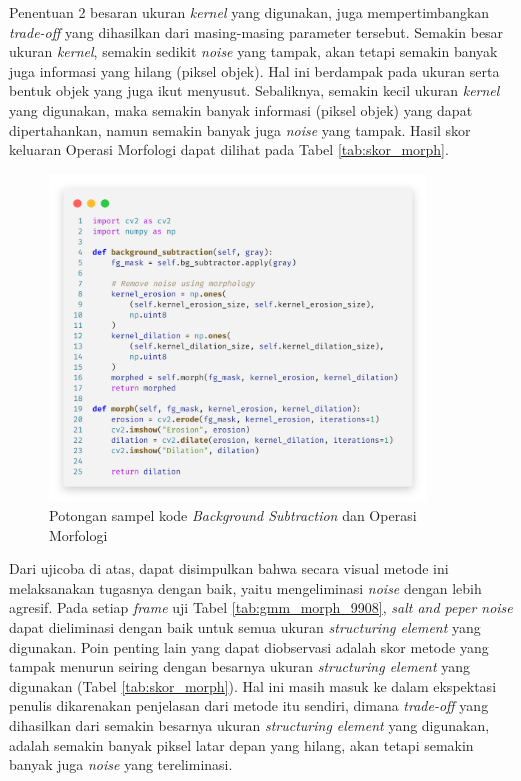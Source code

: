         Penentuan 2 besaran ukuran \textit{kernel} yang digunakan, juga mempertimbangkan \textit{trade-off} yang dihasilkan dari masing-masing parameter tersebut. Semakin besar ukuran \textit{kernel}, semakin sedikit \textit{noise} yang tampak, akan tetapi semakin banyak juga informasi yang hilang (piksel objek). Hal ini berdampak pada ukuran serta bentuk objek yang juga ikut menyusut. Sebaliknya, semakin kecil ukuran \textit{kernel} yang digunakan, maka semakin banyak informasi (piksel objek) yang dapat dipertahankan, namun semakin banyak juga \textit{noise} yang tampak. Hasil skor keluaran Operasi Morfologi dapat dilihat pada Tabel \ref{tab:skor_morph}. 
        
        \vspace{-0.5cm}
        \begin{figure}[H]
        \centering
          \singlespacing
          \captionsetup{justification=centering,margin=0.5cm}
          \includegraphics[width=10cm]{image/CodeSnap/morph.png}
          \caption{Potongan sampel kode \textit{Background Subtraction} dan Operasi Morfologi}
          \label{fig:code_gmm_morph}
        \end{figure}
    
    	Dari ujicoba di atas, dapat disimpulkan bahwa secara visual metode ini melaksanakan tugasnya dengan baik, yaitu mengeliminasi \textit{noise} dengan lebih agresif. Pada setiap \textit{frame} uji Tabel \ref{tab:gmm_morph_9908}, \textit{salt and peper noise} dapat dieliminasi dengan baik untuk semua ukuran \textit{structuring element} yang digunakan. Poin penting lain yang dapat diobservasi adalah skor metode yang tampak menurun seiring dengan besarnya ukuran \textit{structuring element} yang digunakan (Tabel \ref{tab:skor_morph}). Hal ini masih masuk ke dalam ekspektasi penulis dikarenakan penjelasan dari metode itu sendiri, dimana \textit{trade-off} yang dihasilkan dari semakin besarnya ukuran \textit{structuring element} yang digunakan, adalah semakin banyak piksel latar depan yang hilang, akan tetapi semakin banyak juga \textit{noise} yang tereliminasi.
    	
